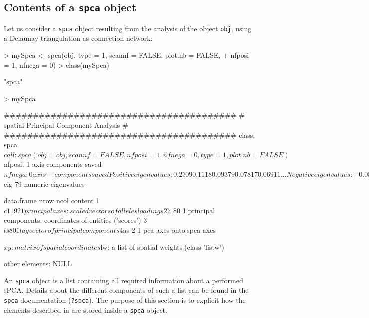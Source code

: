 \documentclass{article}
\begin{document}
\subsection{Contents of a \texttt{spca} object}
Let us consider a \texttt{spca} object resulting from the analysis of
the object \texttt{obj}, using a Delaunay triangulation as connection network:
\begin{Schunk}
\begin{Sinput}
> mySpca <- spca(obj, type = 1, scannf = FALSE, plot.nb = FALSE, 
+     nfposi = 1, nfnega = 0)
> class(mySpca)
\end{Sinput}
\begin{Soutput}
[1] "spca"
\end{Soutput}
\begin{Sinput}
> mySpca
\end{Sinput}
\begin{Soutput}
	########################################
	# spatial Principal Component Analysis #
	########################################
class: spca
$call: spca(obj = obj, scannf = FALSE, nfposi = 1, nfnega = 0, type = 1, 
    plot.nb = FALSE)

$nfposi: 1 axis-components saved
$nfnega: 0 axis-components saved
Positive eigenvalues: 0.2309 0.1118 0.09379 0.07817 0.06911 ...
Negative eigenvalues: -0.08421 -0.07376 -0.06978 -0.06648 -0.06279 ...

  vector length mode    content    
1 $eig   79     numeric eigenvalues

  data.frame nrow ncol content                                                 
1 $c1        192  1    principal axes: scaled vectors of alleles loadings      
2 $li        80   1    principal components: coordinates of entities ('scores')
3 $ls        80   1    lag vector of principal components                      
4 $as        2    1    pca axes onto spca axes                                 

$xy: matrix of spatial coordinates
$lw: a list of spatial weights (class 'listw')

other elements: NULL
\end{Soutput}
\end{Schunk}

\noindent An \texttt{spca} object is a list containing all required
information about a performed sPCA.
Details about the different components of such a list can be found in
the \texttt{spca} documentation (\texttt{?spca}).
The purpose of this section is to explicit how the elements described
in \cite{tjart04} are stored inside a \texttt{spca} object.
\end{document}
